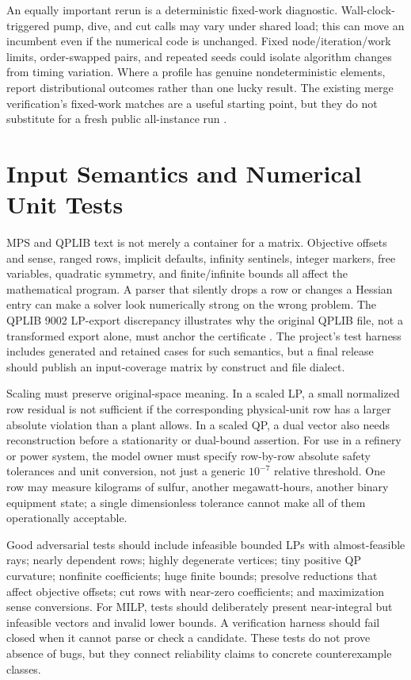 \documentclass[10pt,a4paper,twocolumn]{article}
\begin{document}
An equally important rerun is a deterministic fixed-work diagnostic. Wall-clock-triggered pump, dive, and cut calls may vary under shared load; this can move an incumbent even if the numerical code is unchanged. Fixed node/iteration/work limits, order-swapped pairs, and repeated seeds could isolate algorithm changes from timing variation. Where a profile has genuine nondeterministic elements, report distributional outcomes rather than one lucky result. The existing merge verification's fixed-work matches are a useful starting point, but they do not substitute for a fresh public all-instance run \cite{merge}.

\section{Input Semantics and Numerical Unit Tests}

MPS and QPLIB text is not merely a container for a matrix. Objective offsets and sense, ranged rows, implicit defaults, infinity sentinels, integer markers, free variables, quadratic symmetry, and finite/infinite bounds all affect the mathematical program. A parser that silently drops a row or changes a Hessian entry can make a solver look numerically strong on the wrong problem. The QPLIB 9002 LP-export discrepancy illustrates why the original QPLIB file, not a transformed export alone, must anchor the certificate \cite{qp9002}. The project's test harness includes generated and retained cases for such semantics, but a final release should publish an input-coverage matrix by construct and file dialect.

Scaling must preserve original-space meaning. In a scaled LP, a small normalized row residual is not sufficient if the corresponding physical-unit row has a larger absolute violation than a plant allows. In a scaled QP, a dual vector also needs reconstruction before a stationarity or dual-bound assertion. For use in a refinery or power system, the model owner must specify row-by-row absolute safety tolerances and unit conversion, not just a generic $10^{-7}$ relative threshold. One row may measure kilograms of sulfur, another megawatt-hours, another binary equipment state; a single dimensionless tolerance cannot make all of them operationally acceptable.

Good adversarial tests should include infeasible bounded LPs with almost-feasible rays; nearly dependent rows; highly degenerate vertices; tiny positive QP curvature; nonfinite coefficients; huge finite bounds; presolve reductions that affect objective offsets; cut rows with near-zero coefficients; and maximization sense conversions. For MILP, tests should deliberately present near-integral but infeasible vectors and invalid lower bounds. A verification harness should fail closed when it cannot parse or check a candidate. These tests do not prove absence of bugs, but they connect reliability claims to concrete counterexample classes.
\end{document}
